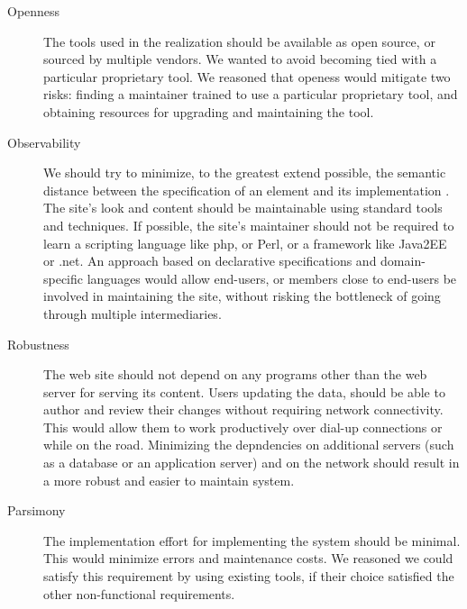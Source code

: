 \documentclass[10pt]{article}
\begin{document}
\begin{description}
\item[Openness] The tools used in the realization
should be available as open source, or sourced by multiple vendors.
We wanted to avoid becoming tied with a particular proprietary
tool.
We reasoned that openess would mitigate two risks:
finding a maintainer trained to use a particular proprietary tool,
and obtaining resources for upgrading and maintaining the tool.

\item[Observability]
We should try to minimize,
to the greatest extend possible, the semantic distance between
the specification of an element and its implementation \cite{SG97}.
The site's look and content should be maintainable
using standard tools and techniques.
If possible, the site's maintainer should not be required to
learn a scripting language like {\sc php}, or Perl, or
a framework like Java2EE or {\sc .net}.
An approach based on declarative specifications and
domain-specific languages would allow end-users, or members
close to end-users be involved in maintaining the site,
without risking the bottleneck of going through
multiple intermediaries.

\item[Robustness] The web site should not depend on
any programs other than the web server for serving
its content.
Users updating the data, should be able to author and
review their changes without requiring network connectivity.
This would allow them to work productively over dial-up connections
or while on the road.
Minimizing the depndencies on additional servers (such as a
database or an application server) and on the network
should result in a more robust and easier to maintain system.

\item[Parsimony] The implementation effort for
implementing the system should be minimal.
This would minimize errors and maintenance costs.
We reasoned we could satisfy this requirement by
using existing tools, if their choice satisfied the
other non-functional requirements.
\end{description}
\end{document}
